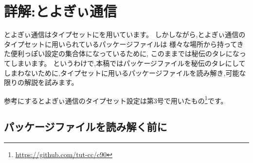 \newcommand*{\reflisting}[1]{\lstlistingname\ \ref{#1}}
\renewcommand*\descriptionlabel[1]{\normalfont\headfont #1 :\hfil}
\newcommand*{\jyquote}[1]{“#1”}

\chapter{詳解:とよぎぃ通信}

とよぎぃ通信はタイプセットに{\pLaTeX}を用いています。
しかしながら,とよぎぃ通信のタイプセットに用いられているパッケージファイルは
様々な場所から持ってきた便利っぽい設定の集合体になっているために,
このままでは秘伝のタレになってしまいます。
というわけで,本稿ではパッケージファイルを秘伝のタレにしてしまわないために,タイプセットに用いるパッケージファイルを読み解き,可能な限りの解説を試みます。

参考にするとよぎぃ通信のタイプセット設定は第3号で用いたもの\footnote{\url{https://github.com/tut-cc/c90}}です。

\section{パッケージファイルを読み解く前に}

